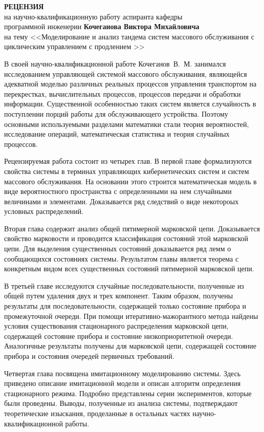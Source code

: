 \documentclass[a4paper,14pt]{extarticle}
\begin{document}
\begin{center}
  \textbf{РЕЦЕНЗИЯ} \medskip 
  \\ на научно-квалификационную работу аспиранта кафедры\\ программной инженерии
  \textbf{Кочеганова Виктора Михайловича}\\ на тему <<Моделирование и анализ тандема систем массового обслуживания с циклическим управлением с продлением
>>
\end{center}

В своей научно-квалификационной работе Кочеганов~В.~М. занимался
исследованием управляющей системой массового обслуживания, являющейся
адекватной моделью различных реальных процессов управления транспортом
на перекрестках, вычислительных процессов, процессов передачи и
обработки информации. Существенной особенностью таких систем является
случайность в поступлении порций работы для обслуживающего
устройства. Поэтому основными используемыми разделами математики стали
теория вероятностей, исследование операций,  математическая статистика и теория случайных процессов.

Рецензируемая работа состоит из четырех глав. В первой главе формализуются свойства системы в терминах управляющих кибернетических систем и систем массового обслуживания. На основании этого строится математическая модель в виде вероятностного пространства с определенными на нем случайными величинами и элементами. Доказывается ряд следствий о виде некотороых условных распределений.

Вторая глава содержит анализ общей пятимерной марковской цепи. Доказывается свойство марковости и проводится классификация состояний этой марковской цепи. Для выделения существенных состояний доказывается ряд лемм о сообщающихся состояниях системы. Результатом главы является теорема с конкретным видом всех существенных состояний пятимерной марковской цепи.

В третьей главе исследуются случайные последовательности, полученные из общей путем удаления двух и трех компонент. Таким образом, получены результаты для последовательности, содержащей только состояние прибора и промежуточной очереди. При помощи итеративно-мажорантного метода найдены условия существования стационарного распределения марковской цепи, содержащей состояние прибора и состояние низкоприоритетной очереди. Аналогичные результаты получены для марковской цепи, содержащей состояние прибора и состояния очередей первичных требований.

Четвертая глава посвящена имитационному моделированию системы. Здесь приведено описание имитационной модели и описан алгоритм определения стационарного режима. Подробно представлены серии экспериментов, которые были проведены. Выводы, полученные из анализа системы, подтверждают теоретические изыскания, проделанные в остальных частях научно-квалификационной работы.
\end{document}
